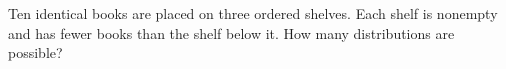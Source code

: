 Ten identical books are placed on three ordered shelves. Each shelf is nonempty and has fewer books than the shelf below it. How many distributions are possible?
